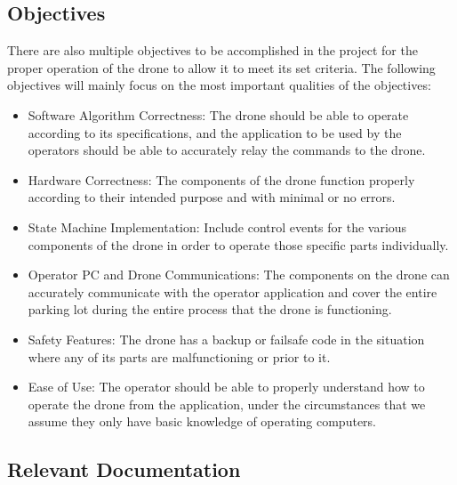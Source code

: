 \documentclass[12pt, titlepage]{article}
\begin{document}

\subsection{Objectives}

There are also multiple objectives to be accomplished in the project for the proper operation of the drone to allow it to meet its set criteria. The following objectives will mainly focus on the most important qualities of the objectives:

\begin{itemize}
    \item Software Algorithm Correctness: The drone should be able to operate according to its specifications, and the application to be used by the operators should be able to accurately relay the commands to the drone.
    \item Hardware Correctness: The components of the drone function properly according to their intended purpose and with minimal or no errors.
    \item State Machine Implementation: Include control events for the various components of the drone in order to operate those specific parts individually.
    \item Operator PC and Drone Communications: The components on the drone can accurately communicate with the operator application and cover the entire parking lot during the entire process that the drone is functioning.
    \item Safety Features: The drone has a backup or failsafe code in the situation where any of its parts are malfunctioning or prior to it.
    \item Ease of Use: The operator should be able to properly understand how to operate the drone from the application, under the circumstances that we assume they only have basic knowledge of operating computers.
\end{itemize}


\subsection{Relevant Documentation}
\end{document}
